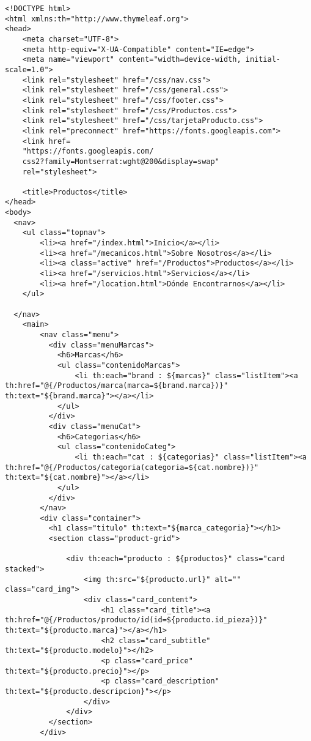 \begin{lstlisting}[caption=Productos.html (LMSI)]
<!DOCTYPE html>
<html xmlns:th="http://www.thymeleaf.org">
<head>
    <meta charset="UTF-8">
    <meta http-equiv="X-UA-Compatible" content="IE=edge">
    <meta name="viewport" content="width=device-width, initial-scale=1.0">
    <link rel="stylesheet" href="/css/nav.css">
    <link rel="stylesheet" href="/css/general.css">
    <link rel="stylesheet" href="/css/footer.css">
    <link rel="stylesheet" href="/css/Productos.css">
    <link rel="stylesheet" href="/css/tarjetaProducto.css">
    <link rel="preconnect" href="https://fonts.googleapis.com">
    <link href=
    "https://fonts.googleapis.com/
    css2?family=Montserrat:wght@200&display=swap"
    rel="stylesheet">

    <title>Productos</title>
</head>
<body>
  <nav>
    <ul class="topnav">
        <li><a href="/index.html">Inicio</a></li>
        <li><a href="/mecanicos.html">Sobre Nosotros</a></li>
        <li><a class="active" href="/Productos">Productos</a></li>
        <li><a href="/servicios.html">Servicios</a></li>
        <li><a href="/location.html">Dónde Encontrarnos</a></li>
    </ul>

  </nav>
    <main>
        <nav class="menu">
          <div class="menuMarcas">
            <h6>Marcas</h6>
            <ul class="contenidoMarcas">
                <li th:each="brand : ${marcas}" class="listItem"><a th:href="@{/Productos/marca(marca=${brand.marca})}" th:text="${brand.marca}"></a></li>
            </ul>
          </div>
          <div class="menuCat">
            <h6>Categorias</h6>
            <ul class="contenidoCateg">
                <li th:each="cat : ${categorias}" class="listItem"><a th:href="@{/Productos/categoria(categoria=${cat.nombre})}" th:text="${cat.nombre}"></a></li>
            </ul>
          </div>
        </nav>
        <div class="container">
          <h1 class="titulo" th:text="${marca_categoria}"></h1>
          <section class="product-grid">

              <div th:each="producto : ${productos}" class="card stacked">
                  <img th:src="${producto.url}" alt="" class="card_img">
                  <div class="card_content">
                      <h1 class="card_title"><a th:href="@{/Productos/producto/id(id=${producto.id_pieza})}" th:text="${producto.marca}"></a></h1>
                      <h2 class="card_subtitle" th:text="${producto.modelo}"></h2>
                      <p class="card_price" th:text="${producto.precio}"></p>
                      <p class="card_description" th:text="${producto.descripcion}"></p>
                  </div>
              </div>
          </section>
        </div>
        

\end{lstlisting}
